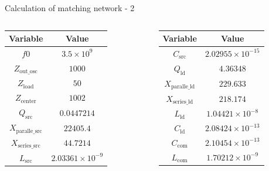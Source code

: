 \documentclass{beamer}
\begin{document}
\begin{frame}[fragile]{Calculation of matching network - 2}
\begin{columns}
  \begin{table}
    \centering
    \begin{tabular}{|c|c|}
        \hline
        \textbf{Variable} & \textbf{Value} \\
        \hline
        $f0$ & $3.5 \times 10^9$ \\
        $Z_{\text{out\_osc}}$ & $1000$ \\
        $Z_{\text{load}}$ & $50$ \\
        $Z_{\text{center}}$ & $1002$ \\
        $Q_{\text{src}}$ & $0.0447214$ \\
        $X_{\text{paralle\_src}}$ & $22405.4$ \\
        $X_{\text{series\_src}}$ & $44.7214$ \\
        $L_{\text{src}}$ & $2.03361 \times 10^{-9}$ \\
        \hline
    \end{tabular}
  \end{table} 
  \begin{table}
    \centering
    \begin{tabular}{|c|c|}
        \hline
        \textbf{Variable} & \textbf{Value} \\
        \hline
        $C_{\text{src}}$ & $2.02955 \times 10^{-15}$ \\
        $Q_{\text{ld}}$ & $4.36348$ \\
        $X_{\text{paralle\_ld}}$ & $229.633$ \\
        $X_{\text{series\_ld}}$ & $218.174$ \\
        $L_{\text{ld}}$ & $1.04421 \times 10^{-8}$ \\
        $C_{\text{ld}}$ & $2.08424 \times 10^{-13}$ \\
        $C_{\text{com}}$ & $2.10454 \times 10^{-13}$ \\
        $L_{\text{com}}$ & $1.70212 \times 10^{-9}$ \\
        \hline
    \end{tabular}
  \end{table} 
\end{columns}

\end{frame}
\end{document}
